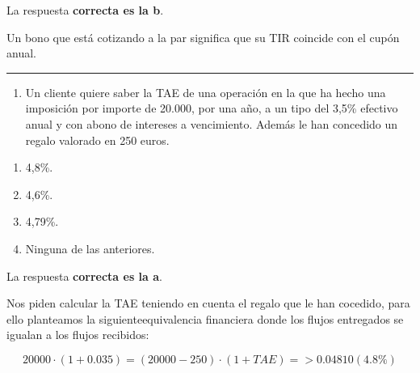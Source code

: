 \documentclass[
  letterpaper,
  DIV=11,
  numbers=noendperiod]{scrreprt}
\providecommand{\tightlist}{%
  \setlength{\itemsep}{0pt}\setlength{\parskip}{0pt}}\usepackage{longtable,booktabs,array}
\begin{document}
\begin{tcolorbox}[enhanced jigsaw, left=2mm, opacityback=0, colback=white, breakable, arc=.35mm, bottomrule=.15mm, rightrule=.15mm, toprule=.15mm, leftrule=.75mm, colframe=quarto-callout-tip-color-frame]
\begin{minipage}[t]{5.5mm}
\textcolor{quarto-callout-tip-color}{\faLightbulb}
\end{minipage}%
\begin{minipage}[t]{\textwidth - 5.5mm}

La respuesta \textbf{correcta es la b}.

Un bono que está cotizando a la par significa que su TIR coincide con el
cupón anual.

\end{minipage}%
\end{tcolorbox}

\begin{center}\rule{0.5\linewidth}{0.5pt}\end{center}

\begin{enumerate}
\def\labelenumi{\arabic{enumi}.}
\setcounter{enumi}{41}
\tightlist
\item
  Un cliente quiere saber la TAE de una operación en la que ha hecho una
  imposición por importe de 20.000, por una año, a un tipo del 3,5\%
  efectivo anual y con abono de intereses a vencimiento. Además le han
  concedido un regalo valorado en 250 euros.
\end{enumerate}

\begin{enumerate}
\def\labelenumi{\alph{enumi})}
\item
  4,8\%.
\item
  4,6\%.
\item
  4,79\%.
\item
  Ninguna de las anteriores.
\end{enumerate}

\begin{tcolorbox}[enhanced jigsaw, left=2mm, opacityback=0, colback=white, breakable, arc=.35mm, bottomrule=.15mm, rightrule=.15mm, toprule=.15mm, leftrule=.75mm, colframe=quarto-callout-tip-color-frame]
\begin{minipage}[t]{5.5mm}
\textcolor{quarto-callout-tip-color}{\faLightbulb}
\end{minipage}%
\begin{minipage}[t]{\textwidth - 5.5mm}

La respuesta \textbf{correcta es la a}.

Nos piden calcular la TAE teniendo en cuenta el regalo que le han
cocedido, para ello planteamos la siguienteequivalencia financiera donde
los flujos entregados se igualan a los flujos recibidos:

\[20000\cdot\left(1+0.035\right)=\left(20000-250\right)\cdot\left(1+TAE\right)=>0.04810(4.8\%)\]

\end{minipage}%
\end{tcolorbox}
\end{document}
